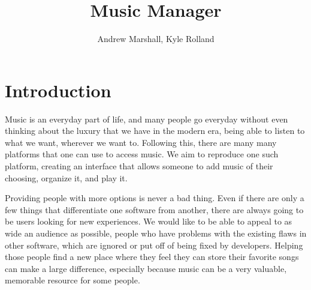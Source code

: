 \documentclass[10pt,conference,onecolumn,compsoc]{IEEEtran}
\begin{document}
\title{Music Manager}
%
%


\author{Andrew Marshall, Kyle Rolland\\%
}



\maketitle



\IEEEdisplaynontitleabstractindextext

\IEEEpeerreviewmaketitle



\section{Introduction}


Music is an everyday part of life, and many people go everyday without even thinking about the luxury that we have in the modern era, being able to listen to what we want, wherever we want to. Following this, there are many many platforms that one can use to access music. We aim to reproduce one such platform, creating an interface that allows someone to add music of their choosing, organize it, and play it. 
	
Providing people with more options is never a bad thing. Even if there are only a few things that differentiate one software from another, there are always going to be users looking for new experiences. We would like to be able to appeal to as wide an audience as possible, people who have problems with the existing flaws in other software, which are ignored or put off of being fixed by developers. Helping those people find a new place where they feel they can store their favorite songs can make a large difference, especially because music can be a very valuable, memorable resource for some people.
\end{document}
